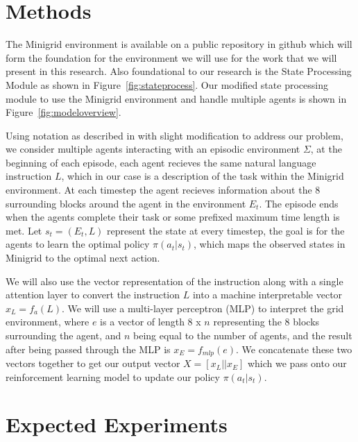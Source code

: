 \documentclass[11pt]{article}
\begin{document}
\section{Methods}

The Minigrid environment is available on a public repository in github which will form the foundation for the environment we will use for the work that we will present in this research. Also foundational to our research is the State Processing Module as shown in Figure~\ref{fig:stateprocess}. Our modified state processing module to use the Minigrid environment and handle multiple agents is shown in Figure~\ref{fig:modeloverview}.



Using notation as described in \cite{Chaplot2017} with slight modification to address our problem, we consider multiple agents interacting with an episodic environment $\Sigma$, at the beginning of each episode, each agent recieves the same natural language instruction $L$, which in our case is a description of the task within the Minigrid environment. At each timestep the agent recieves information about the 8 surrounding blocks around the agent in the environment $E_t$. The episode ends when the agents complete their task or some prefixed maximum time length is met. Let $s_t = (E_t, L)$ represent the state at every timestep, the goal is for the agents to learn the optimal policy $\pi(a_t|s_t)$, which maps the observed states in Minigrid to the optimal next action. 

We will also use the vector representation of the instruction along with a single attention layer to convert the instruction $L$ into a machine interpretable vector $x_L = f_a(L)$. We will use a multi-layer perceptron (MLP) to interpret the grid environment, where $e$ is a vector of length 8 x $n$ representing the 8 blocks surrounding the agent, and $n$ being equal to the number of agents, and the result after being passed through the MLP is $x_E = f_{mlp}(e)$. We concatenate these two vectors together to get our output vector $X = [x_L||x_E]$ which we pass onto our reinforcement learning model to update our policy $\pi(a_t|s_t)$.

\section{Expected Experiments}
\end{document}
